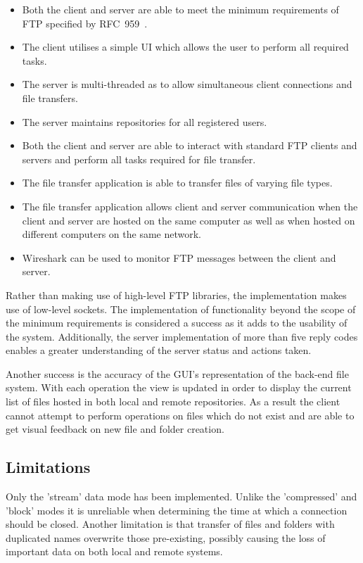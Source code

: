 \documentclass[10pt,twocolumn]{witseiepaper}
\begin{document}
\begin{itemize}
	\item Both the client and server are able to meet the minimum requirements of FTP specified by RFC~959~\cite{rfc959}.
	\item The client utilises a simple UI which allows the user to perform all required tasks.
	\item The server is multi-threaded as to allow simultaneous client connections and file transfers.
	\item The server maintains repositories for all registered users.
	\item Both the client and server are able to interact with standard FTP clients and servers and perform all tasks required for file transfer.
	\item The file transfer application is able to transfer files of varying file types.
	\item The file transfer application allows client and server communication when the client and server are hosted on the same computer as well as when hosted on different computers on the same network.
	\item Wireshark can be used to monitor FTP messages between the client and server. 
\end{itemize} 
\vspace*{-2mm}

Rather than making use of high-level FTP libraries, the implementation makes use of low-level sockets. The implementation of functionality beyond the scope of the minimum requirements is considered a success as it adds to the usability of the system. Additionally, the server implementation of more than five reply codes enables a greater understanding of the server status and actions taken.

Another success is the accuracy of the GUI's representation of the back-end file system. With each operation the view is updated in order to display the current list of files hosted in both local and remote repositories. As a result the client cannot attempt to perform operations on files which do not exist and are able to get visual feedback on new file and folder creation.

\subsection{Limitations}
Only the 'stream' data mode has been implemented. Unlike the 'compressed' and 'block' modes it is unreliable when determining the time at which a connection should be closed. Another limitation is that transfer of files and folders with duplicated names overwrite those pre-existing, possibly causing the loss of important data on both local and remote systems.
\end{document}
